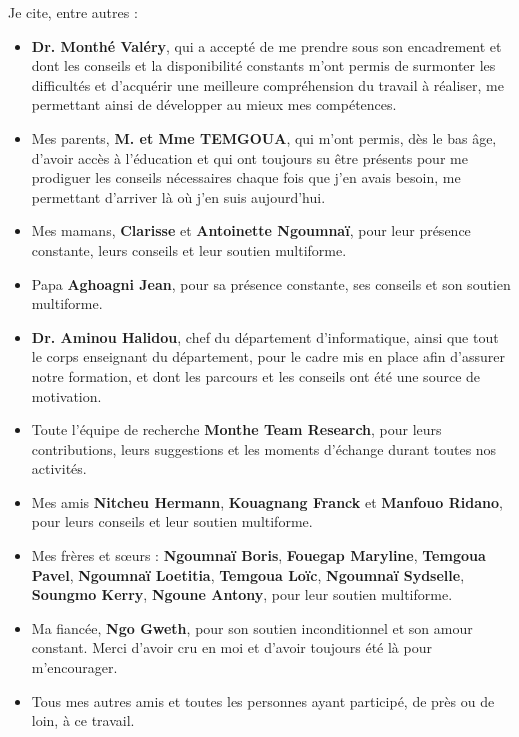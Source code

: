\documentclass[a4paper,12pt]{report}
\begin{document}
Je cite, entre autres : 
\renewcommand{\labelitemi}{\(\circ\)} %
\begin{itemize}
    \item \textbf{Dr. Monthé Valéry}, qui a accepté de me prendre sous son encadrement et dont les conseils et la disponibilité constants m'ont permis de surmonter les difficultés et d’acquérir une meilleure compréhension du travail à réaliser, me permettant ainsi de développer au mieux mes compétences.
    
    \item Mes parents, \textbf{M. et Mme TEMGOUA}, qui m'ont permis, dès le bas âge, d'avoir accès à l'éducation et qui ont toujours su être présents pour me prodiguer les conseils nécessaires chaque fois que j'en avais besoin, me permettant d'arriver là où j'en suis aujourd'hui.
    
    \item Mes mamans, \textbf{Clarisse} et \textbf{Antoinette Ngoumnaï}, pour leur présence constante, leurs conseils et leur soutien multiforme.
    
    \item Papa \textbf{Aghoagni Jean}, pour sa présence constante, ses conseils et son soutien multiforme.
    
    \item \textbf{Dr. Aminou Halidou}, chef du département d'informatique, ainsi que tout le corps enseignant du département, pour le cadre mis en place afin d'assurer notre formation, et dont les parcours et les conseils ont été une source de motivation.
    
    \item Toute l'équipe de recherche \textbf{Monthe Team Research}, pour leurs contributions, leurs suggestions et les moments d’échange durant toutes nos activités.
    
    \item Mes amis \textbf{Nitcheu Hermann}, \textbf{Kouagnang Franck} et \textbf{Manfouo Ridano}, pour leurs conseils et leur soutien multiforme.
    
    \item Mes frères et sœurs : \textbf{Ngoumnaï Boris}, \textbf{Fouegap Maryline}, \textbf{Temgoua Pavel}, \textbf{Ngoumnaï Loetitia}, \textbf{Temgoua Loïc}, \textbf{Ngoumnaï Sydselle}, \textbf{Soungmo Kerry}, \textbf{Ngoune Antony}, pour leur soutien multiforme.
    
    \item Ma fiancée, \textbf{Ngo Gweth}, pour son soutien inconditionnel et son amour constant. Merci d'avoir cru en moi et d'avoir toujours été là pour m'encourager.
    
    \item Tous mes autres amis et toutes les personnes ayant participé, de près ou de loin, à ce travail.
\end{itemize}
\end{document}
